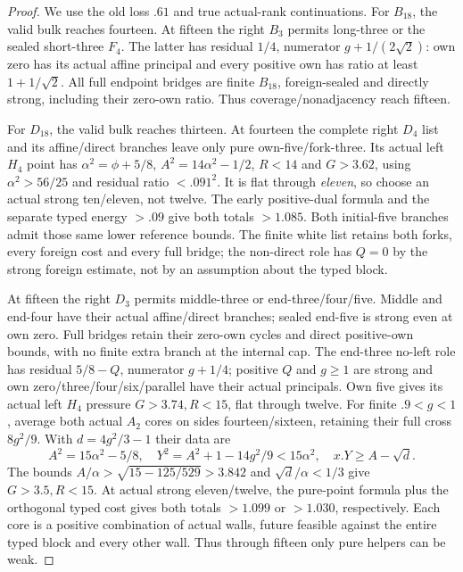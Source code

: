 \documentclass[11pt]{article}
\theoremstyle{definition}
\theoremstyle{remark}
\begin{document}
\begin{proof}
We use the old loss $.61$ and true actual-rank continuations.
For $B_{18}$, the valid bulk reaches fourteen. At fifteen the
right $B_3$ permits long-three or the sealed short-three $F_4$.
The latter has residual $1/4$, numerator $g+1/(2\sqrt2)$:
own zero has its actual affine principal and every positive own
has ratio at least $1+1/\sqrt2$. All full endpoint bridges are
finite $B_{18}$, foreign-sealed and directly strong, including
their zero-own ratio. Thus coverage/nonadjacency reach fifteen.

For $D_{18}$, the valid bulk reaches thirteen. At fourteen the
complete right $D_4$ list and its affine/direct branches leave
only pure own-five/fork-three. Its actual left $H_4$ point has
$\alpha^2=\phi+5/8$, $A^2=14\alpha^2-1/2$, $R<14$ and
$G>3.62$, using $\alpha^2>56/25$ and residual ratio $<.091^2$.
It is flat through \emph{eleven}, so choose an actual strong
ten/eleven, not twelve. The early positive-dual formula and the
separate typed energy $>.09$ give both totals $>1.085$.
Both initial-five branches admit those same lower reference bounds.
The finite white list retains both forks, every foreign cost and
every full bridge; the non-direct role has $Q=0$ by the strong
foreign estimate, not by an assumption about the typed block.

At fifteen the right $D_3$ permits middle-three or end-three/four/five.
Middle and end-four have their actual affine/direct branches;
sealed end-five is strong even at own zero. Full bridges retain
their zero-own cycles and direct positive-own bounds, with no
finite extra branch at the internal cap. The end-three no-left
role has residual $5/8-Q$, numerator $g+1/4$; positive $Q$ and
$g\ge1$ are strong and own zero/three/four/six/parallel have
their actual principals. Own five gives its actual left $H_4$
pressure $G>3.74,R<15$, flat through twelve.
For finite $.9<g<1$, average both actual $A_2$ cores on sides
fourteen/sixteen, retaining their full cross $8g^2/9$.
With $d=4g^2/3-1$ their data are
\[
 A^2=15\alpha^2-5/8,\quad
 Y^2=A^2+1-14g^2/9<15\alpha^2,\quad
 x.Y\ge A-\sqrt d.
\]
The bounds $A/\alpha>\sqrt{15-125/529}>3.842$ and
$\sqrt d/\alpha<1/3$ give $G>3.5,R<15$.
At actual strong eleven/twelve, the pure-point formula plus the
orthogonal typed cost gives both totals $>1.099$ or $>1.030$,
respectively. Each core is a positive combination of actual walls,
future feasible against the entire typed block and every other wall.
Thus through fifteen only pure helpers can be weak.


\end{proof}
\end{document}
